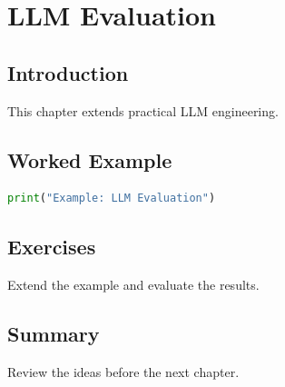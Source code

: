 \chapter{LLM Evaluation}
\label{chap:vol9-15}



\section{Introduction}
This chapter extends practical LLM engineering.

\section{Worked Example}
\begin{lstlisting}[language=Python]
print("Example: LLM Evaluation")
\end{lstlisting}

\section{Exercises}
\begin{exercise}
Extend the example and evaluate the results.
\end{exercise}

\section{Summary}
Review the ideas before the next chapter.
